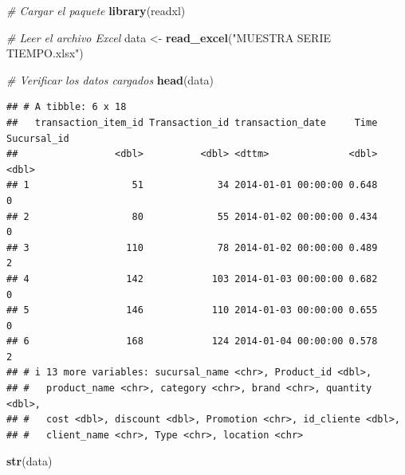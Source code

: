 \documentclass[
]{book}
\newenvironment{Shaded}{\begin{snugshade}}{\end{snugshade}}
\newcommand{\CommentTok}[1]{\textcolor[rgb]{0.56,0.35,0.01}{\textit{#1}}}
\newcommand{\FunctionTok}[1]{\textcolor[rgb]{0.13,0.29,0.53}{\textbf{#1}}}
\newcommand{\NormalTok}[1]{#1}
\newcommand{\OtherTok}[1]{\textcolor[rgb]{0.56,0.35,0.01}{#1}}
\newcommand{\StringTok}[1]{\textcolor[rgb]{0.31,0.60,0.02}{#1}}
\begin{document}
\begin{Shaded}
\begin{Highlighting}[]
\CommentTok{\# Cargar el paquete}
\FunctionTok{library}\NormalTok{(readxl)}

\CommentTok{\# Leer el archivo Excel}
\NormalTok{data }\OtherTok{\textless{}{-}} \FunctionTok{read\_excel}\NormalTok{(}\StringTok{"MUESTRA SERIE TIEMPO.xlsx"}\NormalTok{)}


\CommentTok{\# Verificar los datos cargados}
\FunctionTok{head}\NormalTok{(data)}
\end{Highlighting}
\end{Shaded}

\begin{verbatim}
## # A tibble: 6 x 18
##   transaction_item_id Transaction_id transaction_date     Time Sucursal_id
##                 <dbl>          <dbl> <dttm>              <dbl>       <dbl>
## 1                  51             34 2014-01-01 00:00:00 0.648           0
## 2                  80             55 2014-01-02 00:00:00 0.434           0
## 3                 110             78 2014-01-02 00:00:00 0.489           2
## 4                 142            103 2014-01-03 00:00:00 0.682           0
## 5                 146            110 2014-01-03 00:00:00 0.655           0
## 6                 168            124 2014-01-04 00:00:00 0.578           2
## # i 13 more variables: sucursal_name <chr>, Product_id <dbl>,
## #   product_name <chr>, category <chr>, brand <chr>, quantity <dbl>,
## #   cost <dbl>, discount <dbl>, Promotion <chr>, id_cliente <dbl>,
## #   client_name <chr>, Type <chr>, location <chr>
\end{verbatim}

\begin{Shaded}
\begin{Highlighting}[]
\FunctionTok{str}\NormalTok{(data)}
\end{Highlighting}
\end{Shaded}
\end{document}

